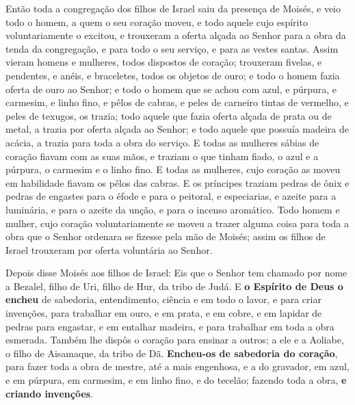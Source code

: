 Então toda a congregação dos filhos de Israel saiu da presença de
Moisés, e veio todo o homem, a quem o seu coração moveu, e
todo aquele cujo espírito voluntariamente o excitou, e trouxeram a
oferta alçada ao Senhor para a obra da tenda da congregação, e para
todo o seu serviço, e para as vestes santas. Assim vieram
homens e mulheres, todos dispostos de coração; trouxeram fivelas, e
pendentes, e anéis, e braceletes, todos os objetos de ouro; e todo o
homem fazia oferta de ouro ao Senhor; e todo o homem que se
achou com azul, e púrpura, e carmesim, e linho fino, e pêlos de
cabras, e peles de carneiro tintas de vermelho, e peles de texugos,
os trazia; todo aquele que fazia oferta alçada de prata ou de
metal, a trazia por oferta alçada ao Senhor; e todo aquele que
possuía madeira de acácia, a trazia para toda a obra do serviço.
E todas as mulheres sábias de coração fiavam com as suas
mãos, e traziam o que tinham fiado, o azul e a púrpura, o carmesim e
o linho fino. E todas as mulheres, cujo coração as moveu em
habilidade fiavam os pêlos das cabras. E os príncipes traziam
pedras de ônix e pedras de engastes para o éfode e para o peitoral,
e especiarias, e azeite para a luminária, e para o azeite da
unção, e para o incenso aromático. Todo homem e mulher, cujo
coração voluntariamente se moveu a trazer alguma coisa para toda a
obra que o Senhor ordenara se fizesse pela mão de Moisés; assim os
filhos de Israel trouxeram por oferta voluntária ao Senhor.

Depois disse Moisés aos filhos de Israel: Eis que o Senhor tem
chamado por nome a Bezalel, filho de Uri, filho de Hur, da tribo de
Judá. E \textbf{o Espírito de Deus o encheu} de sabedoria,
entendimento, ciência e em todo o lavor, e para criar
invenções, para trabalhar em ouro, e em prata, e em cobre, e
em lapidar de pedras para engastar, e em entalhar madeira, e para
trabalhar em toda a obra esmerada. Também lhe dispôs o
coração para ensinar a outros; a ele e a Aoliabe, o filho de
Aisamaque, da tribo de Dã. \textbf{Encheu-os de sabedoria do
coração}, para fazer toda a obra de mestre, até a mais engenhosa, e
a do gravador, em azul, e em púrpura, em carmesim, e em linho fino,
e do tecelão; fazendo toda a obra, \textbf{e criando invenções}.

\medskip

